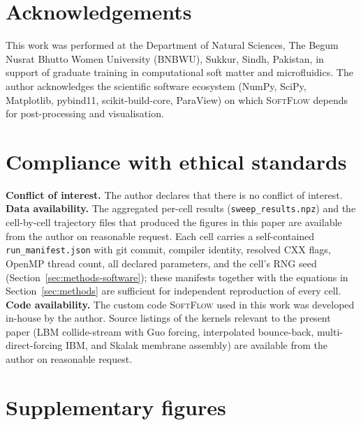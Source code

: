 \documentclass[11pt,a4paper]{article}
\begin{document}
\section*{Acknowledgements}

This work was performed at the Department of Natural Sciences, The
Begum Nusrat Bhutto Women University (BNBWU), Sukkur, Sindh,
Pakistan, in support of graduate training in computational soft
matter and microfluidics. The author acknowledges the scientific
software ecosystem (NumPy, SciPy, Matplotlib, pybind11,
scikit-build-core, ParaView) on which \textsc{SoftFlow} depends for
post-processing and visualisation.

\section*{Compliance with ethical standards}

\textbf{Conflict of interest.} The author declares that there is no
conflict of interest.\\
\textbf{Data availability.} The aggregated per-cell results
(\verb|sweep_results.npz|) and the cell-by-cell trajectory files
that produced the figures in this paper are available from the
author on reasonable request. Each cell carries a self-contained
\verb|run_manifest.json| with git commit, compiler identity,
resolved CXX flags, OpenMP thread count, all declared parameters,
and the cell's RNG seed (Section~\ref{sec:methods-software}); these
manifests together with the equations in Section~\ref{sec:methods}
are sufficient for independent reproduction of every cell.\\
\textbf{Code availability.} The custom code \textsc{SoftFlow} used
in this work was developed in-house by the author. Source listings
of the kernels relevant to the present paper (LBM collide-stream
with Guo forcing, interpolated bounce-back, multi-direct-forcing
IBM, and Skalak membrane assembly) are available from the author
on reasonable request.



\newpage
\appendix
\section*{Supplementary figures}
\label{sec:supp}
\end{document}
